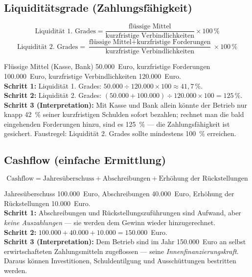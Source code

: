 \documentclass[11pt, a4paper]{article}
\begin{document}
\subsection{Liquiditätsgrade (Zahlungsfähigkeit)}

\[
\mbox{Liquidität 1. Grades} =
\frac{\mbox{flüssige Mittel}}{\mbox{kurzfristige Verbindlichkeiten}} \times 100\,\%
\]
\[
\mbox{Liquidität 2. Grades} =
\frac{\mbox{flüssige Mittel} + \mbox{kurzfristige Forderungen}}
     {\mbox{kurzfristige Verbindlichkeiten}} \times 100\,\%
\]

\begin{beispiel}[title={Beispiel: Liquidität 1. und 2. Grades}]
Flüssige Mittel (Kasse, Bank) 50.000~Euro, kurzfristige Forderungen 100.000~Euro,
kurzfristige Verbindlichkeiten 120.000~Euro.\\
\textbf{Schritt 1:} Liquidität 1. Grades: $50.000 \div 120.000 \times 100
\approx 41{,}7\,\%$.\\
\textbf{Schritt 2:} Liquidität 2. Grades: $(50.000 + 100.000) \div 120.000 \times 100
= 125\,\%$.\\
\textbf{Schritt 3 (Interpretation):} Mit Kasse und Bank allein könnte der Betrieb nur
knapp 42~\% seiner kurzfristigen Schulden sofort bezahlen; rechnet man die bald
eingehenden Forderungen hinzu, sind es 125~\% --- die Zahlungsfähigkeit ist gesichert.
Faustregel: Liquidität 2. Grades sollte mindestens 100~\% erreichen.
\end{beispiel}

\subsection{Cashflow (einfache Ermittlung)}

\[
\mbox{Cashflow} = \mbox{Jahresüberschuss} + \mbox{Abschreibungen}
+ \mbox{Erhöhung der Rückstellungen}
\]

\begin{beispiel}[title={Beispiel: Cashflow}]
Jahresüberschuss 100.000~Euro, Abschreibungen 40.000~Euro, Erhöhung der Rückstellungen
10.000~Euro.\\
\textbf{Schritt 1:} Abschreibungen und Rückstellungszuführungen sind Aufwand, aber
\emph{keine Auszahlungen} --- sie werden dem Gewinn wieder hinzugerechnet.\\
\textbf{Schritt 2:} $100.000 + 40.000 + 10.000 = 150.000$~Euro.\\
\textbf{Schritt 3 (Interpretation):} Dem Betrieb sind im Jahr 150.000~Euro an
selbst erwirtschafteten Zahlungsmitteln zugeflossen --- seine
\emph{Innenfinanzierungskraft}. Daraus können Investitionen, Schuldentilgung und
Ausschüttungen bestritten werden.
\end{beispiel}
\end{document}
